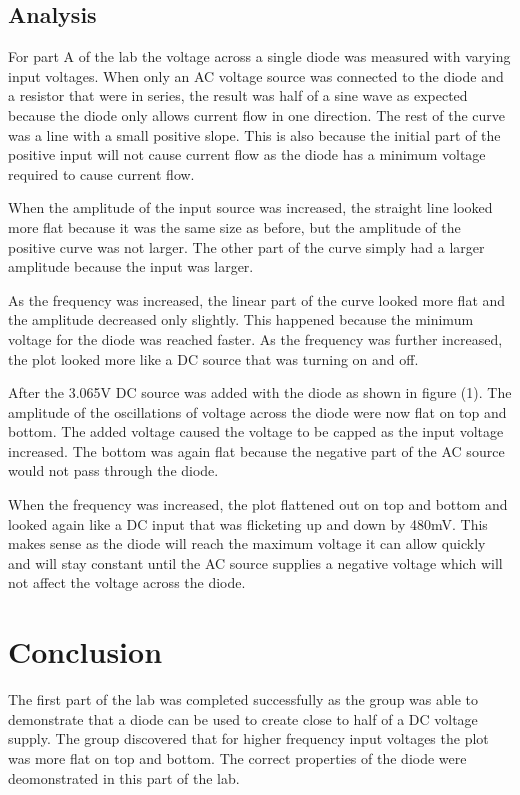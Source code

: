 \documentclass[twocolumn, amsmath]{revtex4}
\begin{document}



 
\subsection{Analysis}
For part A of the lab the voltage across a single diode was measured with varying input voltages. When only an AC voltage source was connected to the diode and a resistor that were in series, the result was half of a sine wave as expected because the diode only allows current flow in one direction. The rest of the curve was a line with a small positive slope. 
This is also because the initial part of the positive input will not cause current flow as the diode has a minimum voltage required to cause current flow. 

When the amplitude of the input source was increased, the straight line looked more flat because it was the same size as before, but the amplitude of the positive curve was not larger. The other part of the curve simply had a larger amplitude because the input was larger. 

As the frequency was increased, the linear part of the curve looked more flat and the amplitude decreased only slightly. This happened because the minimum voltage for the diode was reached faster. As the frequency was further increased, the plot looked more like a DC source that was turning on and off.

After the 3.065V DC source was added with the diode as shown in figure (1). The amplitude of the oscillations of voltage across the diode were now flat on top and bottom. The added voltage caused the voltage to be capped as the input voltage increased. The bottom was again flat because the negative part of the AC source would not pass through the diode.

When the frequency was increased, the plot flattened out on top and bottom and looked again like a DC input that was flicketing up and down by 480mV. This makes sense as the diode will reach the maximum voltage it can allow quickly and will stay  constant until the AC source supplies a negative voltage which will not affect the voltage across the diode.






\section{Conclusion}
The first part of the lab was completed successfully as the group was able to demonstrate that a diode can be used to create close to half of a DC voltage supply. The group discovered that for higher frequency input voltages the plot was more flat on top and bottom. The correct properties of the diode were deomonstrated in this part of the lab.
\end{document}

